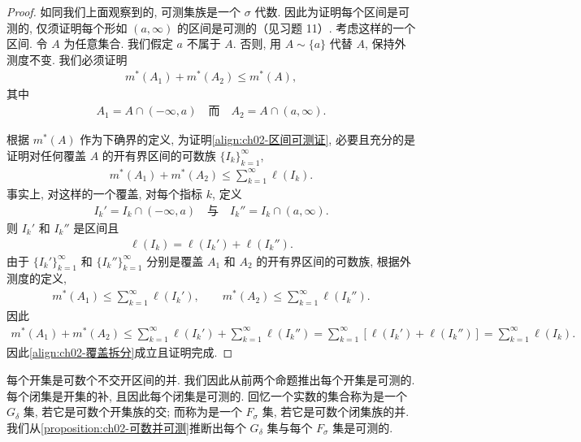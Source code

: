 \documentclass[../../main.tex]{subfiles}
\begin{document}
\begin{proof}
如同我们上面观察到的, 可测集族是一个 $\sigma$ 代数. 因此为证明每个区间是可测的, 仅须证明每个形如 $(a,\infty)$ 的区间是可测的（见习题 11）. 考虑这样的一个区间. 令 $A$ 为任意集合. 我们假定 $a$ 不属于 $A$. 否则, 用 $A\sim\{a\}$ 代替 $A$, 保持外测度不变. 我们必须证明
\begin{align}
m^{*}(A_{1})+m^{*}(A_{2})\leqslant m^{*}(A),\label{align:ch02-区间可测证}
\end{align}
其中
\begin{align*}
A_{1}=A\cap(-\infty,a)\quad\text{而}\quad A_{2}=A\cap(a,\infty).
\end{align*}

根据 $m^{*}(A)$ 作为下确界的定义, 为证明\eqref{align:ch02-区间可测证}, 必要且充分的是证明对任何覆盖 $A$ 的开有界区间的可数族 $\{I_{k}\}_{k=1}^{\infty}$,
\begin{align}
m^{*}(A_{1})+m^{*}(A_{2})\leqslant\sum_{k=1}^{\infty}\ell(I_{k}).\label{align:ch02-覆盖拆分}
\end{align}
事实上, 对这样的一个覆盖, 对每个指标 $k$, 定义
\begin{align*}
I_{k}'=I_{k}\cap(-\infty,a)\quad\text{与}\quad I_{k}''=I_{k}\cap(a,\infty).
\end{align*}
则 $I_{k}'$ 和 $I_{k}''$ 是区间且
\begin{align*}
\ell(I_{k})=\ell(I_{k}')+\ell(I_{k}'').
\end{align*}
由于 $\{I_{k}'\}_{k=1}^{\infty}$ 和 $\{I_{k}''\}_{k=1}^{\infty}$ 分别是覆盖 $A_{1}$ 和 $A_{2}$ 的开有界区间的可数族, 根据外测度的定义,
\begin{align*}
m^{*}(A_{1})\leqslant\sum_{k=1}^{\infty}\ell(I_{k}'),\qquad m^{*}(A_{2})\leqslant\sum_{k=1}^{\infty}\ell(I_{k}'').
\end{align*}
因此
\begin{align*}
m^{*}(A_{1})+m^{*}(A_{2})\leqslant\sum_{k=1}^{\infty}\ell(I_{k}')+\sum_{k=1}^{\infty}\ell(I_{k}'')=\sum_{k=1}^{\infty}\left[\ell(I_{k}')+\ell(I_{k}'')\right]=\sum_{k=1}^{\infty}\ell(I_{k}).
\end{align*}
因此\eqref{align:ch02-覆盖拆分}成立且证明完成.
\end{proof}

每个开集是可数个不交开区间的并. 我们因此从前两个命题推出每个开集是可测的. 每个闭集是开集的补, 且因此每个闭集是可测的. 回忆一个实数的集合称为是一个 $G_{\delta}$ 集, 若它是可数个开集族的交; 而称为是一个 $F_{\sigma}$ 集, 若它是可数个闭集族的并. 我们从\cref{proposition:ch02-可数并可测}推断出每个 $G_{\delta}$ 集与每个 $F_{\sigma}$ 集是可测的.
\end{document}
